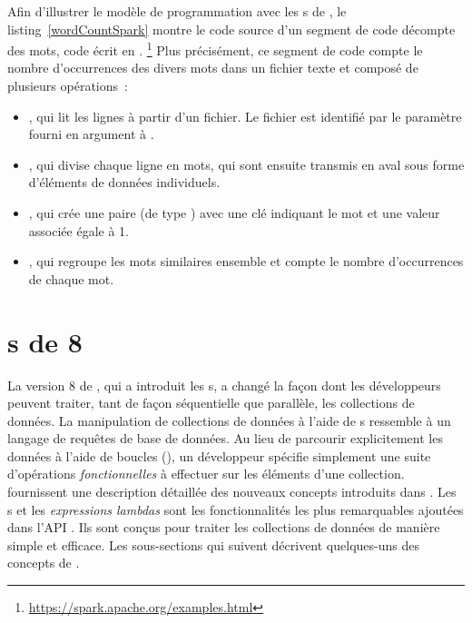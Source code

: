 Afin d'illustrer le mod\`ele de programmation avec les s de , le listing~\ref{wordCountSpark} montre le code source d'un segment de code d\'ecompte des mots, code \'ecrit en .%
%
\footnote{\url{https://spark.apache.org/examples.html}}
%
Plus pr\'ecis\'ement, ce segment de code compte le nombre d'occurrences des divers mots dans un fichier texte et compos\'e de plusieurs op\'erations~: 
\begin{itemize}

\item {}, qui lit les lignes \`a partir d'un fichier. Le fichier est identifi\'e par le param\`etre fourni en argument \`a .

\item {}, qui divise chaque ligne en mots, qui sont ensuite transmis en aval sous forme d'\'el\'ements de donn\'ees individuels.

\item {}, qui cr\'ee une paire (de type ) avec une cl\'e indiquant le mot et une valeur associ\'ee \'egale \`a 1.

\item {}, qui regroupe les mots similaires ensemble et compte le nombre d'occurrences de chaque mot.


\end{itemize}



\section{s de  8}
\label{java8.sect}

La version 8 de , qui a introduit les s, a chang\'e la façon dont les d\'eveloppeurs peuvent traiter, tant de fa\c{c}on s\'equentielle que parall\`ele, les collections de donn\'ees. La manipulation de collections de donn\'ees \`a l'aide de s ressemble \`a un langage de requ\^etes de base de donn\'ees. Au lieu de parcourir explicitement les donn\'ees \`a l'aide de boucles (), un d\'eveloppeur sp\'ecifie simplement une suite d'op\'erations \emph{fonctionnelles} \`a effectuer sur les \'el\'ements d'une collection. \cite{urma2014java} fournissent une description d\'etaill\'ee des nouveaux concepts introduits dans . Les s et les \emph{expressions lambdas} sont les fonctionnalit\'es les plus remarquables ajout\'ees dans l'API \citep{javaStreamAPI}. Ils sont con\c{c}us pour traiter les collections de donn\'ees de mani\`ere simple et efficace. Les sous-sections qui suivent d\'ecrivent quelques-uns des concepts de .


